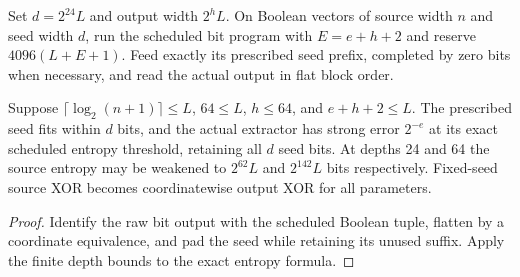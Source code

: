 \begin{definition}
  \label{def:lowerbounds-algebraic-matched-extractor}
  \leanok
  Set $d=2^{24}L$ and output width $2^hL$.
  On Boolean vectors of source width $n$ and seed width $d$, run the
  scheduled bit program with $E=e+h+2$ and reserve $4096(L+E+1)$.
  Feed exactly its prescribed seed prefix, completed by zero bits when
  necessary, and read the actual output in flat block order.
\end{definition}

\begin{theorem}
  \label{thm:lowerbounds-algebraic-matched-extractor}
  \leanok
  Suppose $\lceil\log_2(n+1)\rceil\le L$, $64\le L$, $h\le64$, and
  $e+h+2\le L$. The prescribed seed fits within $d$ bits, and the actual
  extractor has strong error $2^{-e}$ at its exact scheduled entropy
  threshold, retaining all $d$ seed bits. At depths 24 and 64 the source
  entropy may be weakened to $2^{62}L$ and $2^{142}L$ bits respectively.
  Fixed-seed source XOR becomes coordinatewise output XOR for all parameters.
\end{theorem}
\begin{proof}
  \leanok
  Identify the raw bit output with the scheduled Boolean tuple, flatten
  by a coordinate equivalence, and pad the seed while retaining its
  unused suffix. Apply the finite depth bounds to the exact entropy formula.
\end{proof}


